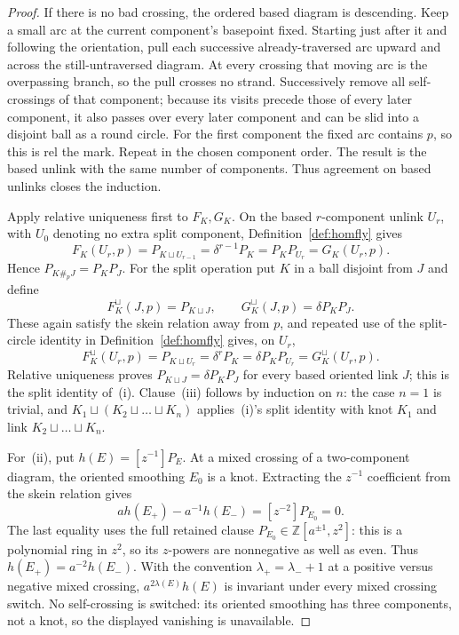\begin{proof}
If there is no bad crossing, the ordered based diagram is descending. Keep a
small arc at the current component's basepoint fixed. Starting just after it
and following the orientation, pull each successive already-traversed arc
upward and across the still-untraversed diagram. At every crossing that moving
arc is the overpassing branch, so the pull crosses no strand. Successively
remove all self-crossings of that component; because its visits precede those
of every later component, it also passes over every later component and can be
slid into a disjoint ball as a round circle. For the first component the fixed
arc contains $p$, so this is rel the mark. Repeat in the chosen component
order. The result is the based unlink with the same number of components.
Thus agreement on based unlinks closes the induction.

Apply relative uniqueness first to $F_K,G_K$. On the based $r$-component
unlink $U_r$, with $U_0$ denoting no extra split component,
Definition~\ref{def:homfly} gives
\[
 F_K(U_r,p)=P_{K\sqcup U_{r-1}}=\delta^{r-1}P_K
 =P_KP_{U_r}=G_K(U_r,p).
\]
Hence $P_{K\#_pJ}=P_KP_J$. For the split operation put $K$ in a ball
disjoint from $J$ and define
\[
 F_K^{\sqcup}(J,p)=P_{K\sqcup J},\qquad
 G_K^{\sqcup}(J,p)=\delta P_KP_J.
\]
These again satisfy the skein relation away from $p$, and repeated use of the
split-circle identity in Definition~\ref{def:homfly} gives, on $U_r$,
\[
 F_K^{\sqcup}(U_r,p)=P_{K\sqcup U_r}=\delta^rP_K
 =\delta P_KP_{U_r}=G_K^{\sqcup}(U_r,p).
\]
Relative uniqueness proves $P_{K\sqcup J}=\delta P_KP_J$ for every based
oriented link $J$; this is the split identity of~(i). Clause~(iii) follows by
induction on $n$: the case $n=1$ is trivial, and
$K_1\sqcup(K_2\sqcup\dots\sqcup K_n)$ applies~(i)'s split identity with knot
$K_1$ and link $K_2\sqcup\dots\sqcup K_n$.

For~(ii), put $h(E)=[z^{-1}]P_E$. At a mixed crossing of a two-component
diagram, the oriented smoothing $E_0$ is a knot. Extracting the $z^{-1}$
coefficient from the skein relation gives
\[
 a h(E_+)-a^{-1}h(E_-)=[z^{-2}]P_{E_0}=0.
\]
The last equality uses the full retained clause
$P_{E_0}\in\mathbb Z[a^{\pm1},z^2]$: this is a polynomial ring in $z^2$, so
its $z$-powers are nonnegative as well as even. Thus
$h(E_+)=a^{-2}h(E_-)$. With the convention
$\lambda_+=\lambda_-+1$ at a positive versus negative mixed crossing,
$a^{2\lambda(E)}h(E)$ is invariant under every mixed crossing switch.
No self-crossing is switched: its oriented smoothing has three components,
not a knot, so the displayed vanishing is unavailable.


\end{proof}

